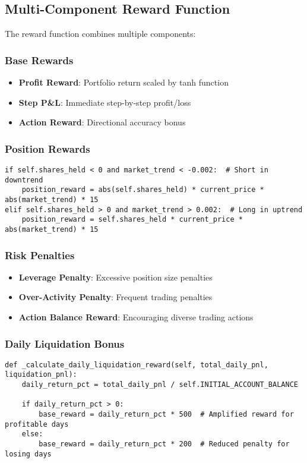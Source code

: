 \documentclass[11pt,a4paper]{article}
\begin{document}
\subsection{Multi-Component Reward Function}

The reward function combines multiple components:

\subsubsection{Base Rewards}
\begin{itemize}
    \item \textbf{Profit Reward}: Portfolio return scaled by tanh function
    \item \textbf{Step P\&L}: Immediate step-by-step profit/loss
    \item \textbf{Action Reward}: Directional accuracy bonus
\end{itemize}

\subsubsection{Position Rewards}
\begin{lstlisting}[caption={Position Holding Rewards (StockTradingEnv2.py:271-286)}]
if self.shares_held < 0 and market_trend < -0.002:  # Short in downtrend
    position_reward = abs(self.shares_held) * current_price * abs(market_trend) * 15
elif self.shares_held > 0 and market_trend > 0.002:  # Long in uptrend
    position_reward = self.shares_held * current_price * abs(market_trend) * 15
\end{lstlisting}

\subsubsection{Risk Penalties}
\begin{itemize}
    \item \textbf{Leverage Penalty}: Excessive position size penalties
    \item \textbf{Over-Activity Penalty}: Frequent trading penalties
    \item \textbf{Action Balance Reward}: Encouraging diverse trading actions
\end{itemize}

\subsubsection{Daily Liquidation Bonus}
\begin{lstlisting}[caption={Daily Performance Reward (StockTradingEnv2.py:106-141)}]
def _calculate_daily_liquidation_reward(self, total_daily_pnl, liquidation_pnl):
    daily_return_pct = total_daily_pnl / self.INITIAL_ACCOUNT_BALANCE
    
    if daily_return_pct > 0:
        base_reward = daily_return_pct * 500  # Amplified reward for profitable days
    else:
        base_reward = daily_return_pct * 200  # Reduced penalty for losing days
\end{lstlisting}
\end{document}
